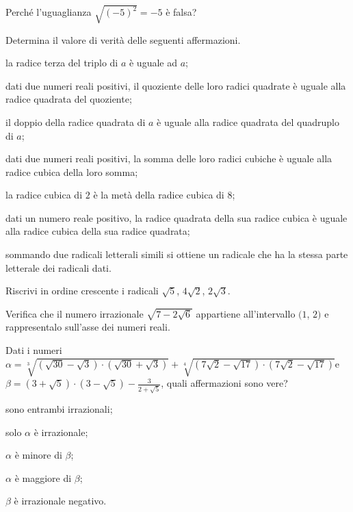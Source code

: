 \begin{esercizio}%
Perché l'uguaglianza $\sqrt{(-5)^2}=-5$ è falsa?
\end{esercizio}

\begin{esercizio}%
Determina il valore di verità delle seguenti affermazioni.
\begin{enumeratea}
 \item la radice terza del triplo di $a$ è uguale ad $a$;
 \item dati due numeri reali positivi, il quoziente delle loro radici quadrate è uguale alla radice quadrata del quoziente;
 \item il doppio della radice quadrata di $a$ è uguale alla radice quadrata del quadruplo di $a$;
 \item dati due numeri reali positivi, la somma delle loro radici cubiche è uguale alla radice cubica della loro somma;
 \item la radice cubica di $2$ è la metà della radice cubica di $8$;
 \item dati un numero reale positivo, la radice quadrata della sua radice cubica è uguale alla radice cubica della sua radice quadrata;
 \item sommando due radicali letterali simili si ottiene un radicale che ha la stessa parte letterale dei radicali dati.
\end{enumeratea}
\end{esercizio}

\begin{esercizio}%
Riscrivi in ordine crescente i radicali $\sqrt 5$, $4\sqrt 2$, $2\sqrt 3$.
\end{esercizio}

\begin{esercizio}%
Verifica che il numero irrazionale $\sqrt{7-2\sqrt 6}$ appartiene all'intervallo $(1$, $2)$ e rappresentalo sull'asse dei numeri reali.
\end{esercizio}

\begin{esercizio}%
Dati i numeri\quad $\alpha =\sqrt[3]{(\sqrt{30}-\sqrt 3)\cdot (\sqrt{30}+\sqrt 3)}+\sqrt[4]{(7\sqrt 2-\sqrt{17})\cdot (7\sqrt 2-\sqrt{17})}$\quad e $\beta =(3+\sqrt 5)\cdot (3-\sqrt 5)-\frac 3{2+\sqrt 5}$, quali affermazioni sono vere?
\begin{multicols}{2}
\begin{enumeratea}
 \item sono entrambi irrazionali;
 \item solo $\alpha$ è irrazionale;
 \item $\alpha$ è minore di $\beta$;
 \item $\alpha$ è maggiore di $\beta$;
 \item $\beta$ è irrazionale negativo.
\end{enumeratea}
\end{multicols}
\end{esercizio}

